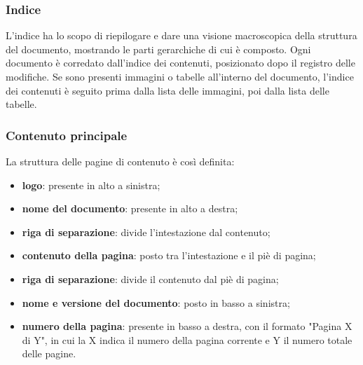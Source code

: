 \subsubsection{Indice}
L'indice ha lo scopo di riepilogare e dare una visione macroscopica della struttura del documento, mostrando le parti gerarchiche di cui è composto. Ogni documento è corredato dall'indice dei contenuti, posizionato dopo il registro delle modifiche. Se sono presenti immagini o tabelle all'interno del documento, l'indice dei contenuti è seguito prima dalla lista delle immagini, poi dalla lista delle tabelle.

\subsubsection{Contenuto principale}
La struttura delle pagine di contenuto è così definita: \begin{itemize}
\item \textbf{logo}: presente in alto a sinistra;
\item \textbf{nome del documento}: presente in alto a destra;
\item \textbf{riga di separazione}: divide l'intestazione dal contenuto;
\item \textbf{contenuto della pagina}: posto tra l'intestazione e il piè di pagina;
\item \textbf{riga di separazione}: divide il contenuto dal piè di pagina;
\item \textbf{nome e versione del documento}: posto in basso a sinistra;
\item \textbf{numero della pagina}: presente in basso a destra, con il formato "Pagina X di Y", in cui la X indica il numero della pagina corrente e Y il numero totale delle pagine.
\end{itemize}

